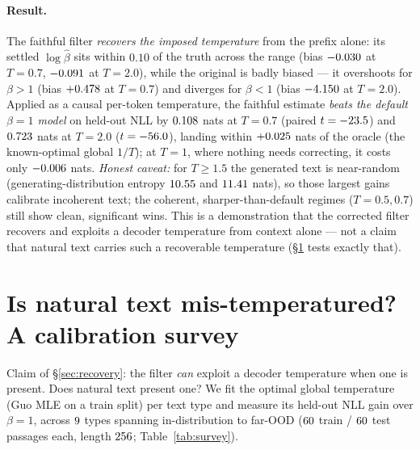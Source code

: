 \documentclass[11pt]{article}
\newcommand{\tabdir}{../results/tables}
\begin{document}
\paragraph{Result.}
The faithful filter \emph{recovers the imposed temperature} from the prefix
alone: its settled $\log\hat\beta$ sits within $0.10$ of the truth across the
range (bias $-0.030$ at $T{=}0.7$, $-0.091$ at $T{=}2.0$),
while the original is badly biased --- it overshoots for $\beta>1$ (bias
$+0.478$ at $T{=}0.7$) and diverges for $\beta<1$ (bias
$-4.150$ at $T{=}2.0$). Applied as a causal per-token temperature, the
faithful estimate \emph{beats the default $\beta{=}1$ model} on held-out NLL by
$0.108$ nats at $T{=}0.7$ (paired $t=-23.5$) and
$0.723$ nats at $T{=}2.0$ ($t=-56.0$), landing within
$+0.025$ nats of the oracle (the known-optimal global $1/T$); at $T{=}1$,
where nothing needs correcting, it costs only $-0.006$ nats. \emph{Honest
caveat:} for $T\ge1.5$ the generated text is near-random (generating-distribution
entropy $10.55$ and $11.41$ nats), so those largest
gains calibrate incoherent text; the coherent, sharper-than-default regimes
($T=0.5,0.7$) still show clean, significant wins. This is a demonstration that the
corrected filter recovers and exploits a decoder temperature from context alone
--- not a claim that natural text carries such a recoverable temperature
(\S\ref{sec:survey} tests exactly that).

\begin{table}[h]
\centering
\caption{Controlled recovery: self-text generated at a \emph{known} $\beta=1/T$.
The faithful filter recovers $\log\beta$ (small bias); the original is badly
biased. Applied causally per token, the faithful temperature reduces held-out NLL
vs $\beta{=}1$ ($\Delta$NLL in nats, positive $=$ improvement), within the
`oracle gap' of the known-optimal global $1/T$. gen.\ $H$ is the mean entropy of
the generating distribution (nats); $T\ge1.5$ is near-random.}
\label{tab:recovery}

\end{table}

\section{Is natural text mis-temperatured? A calibration survey}\label{sec:survey}
Claim of \S\ref{sec:recovery}: the filter \emph{can} exploit a decoder temperature
when one is present. Does natural text present one? We fit the optimal global
temperature (Guo MLE on a train split) per text type and measure its held-out NLL
gain over $\beta=1$, across $9$ types spanning in-distribution to
far-OOD ($60$ train / $60$ test passages each, length
$256$; Table~\ref{tab:survey}).
\end{document}
